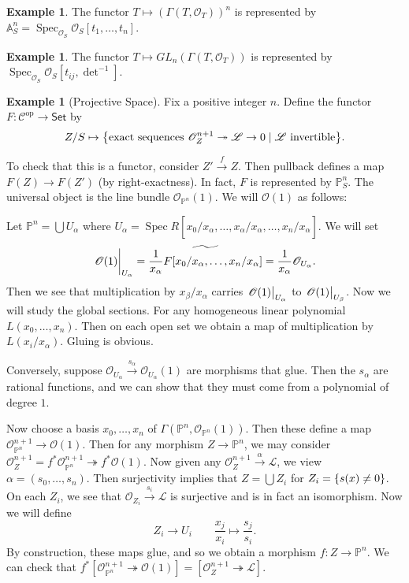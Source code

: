 \documentclass[leqno, openany]{memoir}
\theoremstyle{definition}
\newtheorem{exm}[thm]{Example}
\theoremstyle{remark}
\theoremstyle{plain}
\theoremstyle{definition}
\theoremstyle{remark}
\newcommand{\A}{\mathbb{A}}
\renewcommand{\P}{\mathbb{P}}
\newcommand{\mr}[1]{\mathrm{#1}}
\newcommand{\ms}[1]{\mathsf{#1}}
\newcommand{\msc}[1]{\mathscr{#1}}
\newcommand{\wt}[1]{\widetilde{#1}}
\newcommand{\wh}[1]{\widehat{#1}}
\DeclareMathOperator{\Spec}{Spec}
\begin{document}
\begin{exm}
    The functor $T \mapsto {(\Gamma(T, \msc{O}_T))}^n$ is represented by $\A^n_S = \Spec_{\msc{O}_S} \msc{O}_S[t_1, \ldots, t_n]$.
\end{exm}

\begin{exm}
    The functor $T \mapsto GL_n(\Gamma(T, \msc{O}_T))$ is represented by $\Spec_{\msc{O}_S} \msc{O}_S[t_{ij}, \det^{-1}]$.
\end{exm}

\begin{exm}[Projective Space]
    Fix a positive integer $n$. Define the functor $F \colon \msc{C}^{\mr{op}} \to \ms{Set}$ by
    \[ Z/S \mapsto \qty{\text{exact sequences}\ \msc{O}_Z^{n+1} \twoheadrightarrow \msc{L} \to 0 \mid \msc{L}\ \text{invertible}}. \]

    To check that this is a functor, consider $Z' \xrightarrow{f} Z$. Then pullback defines a map $F(Z) \to F(Z')$ (by right-exactness). In fact, $F$ is represented by $\P^n_S$. The universal object is the line bundle $\msc{O}_{\P^n}(1)$. We will $\msc{O}(1)$ as follows:

    Let $\P^n = \bigcup U_{\alpha}$ where $U_{\alpha} = \Spec R[x_0/x_{\alpha}, \ldots, \wh{x_{\alpha}/x_{\alpha}}, \ldots, x_n/x_{\alpha}]$. We will set
    \[ \eval{\msc{O}(1)}_{U_{\alpha}} = \wt{\frac{1}{x_{\alpha}} F[x_0/x_{\alpha}, \ldots, x_n/x_{\alpha}]} = \frac{1}{x_{\alpha}} \msc{O}_{U_{\alpha}}. \]
    Then we see that multiplication by $x_{\beta}/x_{\alpha}$ carries $\eval{\msc{O}(1)}_{U_{\alpha}}$ to $\eval{\msc{O}(1)}_{U_{\beta}}$. Now we will study the global sections. For any homogeneous linear polynomial $L(x_0, \ldots, x_n)$. Then on each open set we obtain a map of multiplication by $L(x_i/x_{\alpha})$. Gluing is obvious.

    Conversely, suppose $\msc{O}_{U_{\alpha}} \xrightarrow{s_{\alpha}} \msc{O}_{U_{\alpha}}(1)$ are morphisms that glue. Then the $s_{\alpha}$ are rational functions, and we can show that they must come from a polynomial of degree $1$.

    Now choose a basis $x_0, \ldots, x_n$ of $\Gamma(\P^n, \msc{O}_{\P^n}(1))$. Then these define a map $\msc{O}_{\P^n}^{n+1} \to \msc{O}(1)$. Then for any morphism $Z \to \P^n$, we may consider $\msc{O}_Z^{n+1} = f^* \msc{O}_{\P^n}^{n+1} \twoheadrightarrow f^* \msc{O}(1)$. Now given any $\msc{O}_Z^{n+1} \xrightarrow{\alpha} \msc{L}$, we view $\alpha = (s_0, \ldots, s_n)$. Then surjectivity implies that $Z = \bigcup Z_i$ for $Z_i = \qty{s(x) \neq 0}$. On each $Z_i$, we see that $\msc{O}_{Z_i} \xrightarrow{s_i} \msc{L}$ is surjective and is in fact an isomorphism. Now we will define
    \[ Z_i \to U_i \qquad \frac{x_j}{x_{i}} \mapsto \frac{s_j}{s_i}. \]
    By construction, these maps glue, and so we obtain a morphism $f \colon Z \to \P^n$. We can check that $f^* [\msc{O}_{\P^n}^{n+1} \twoheadrightarrow \msc{O}(1)] = [\msc{O}_Z^{n+1} \twoheadrightarrow \msc{L}]$.
\end{exm}
\end{document}
